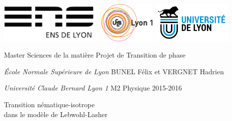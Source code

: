 \documentclass[11pt,a4paper]{article}
\author{Bunel Félix et Vergnet Hadrien}
\numberwithin{equation}{section}
\begin{document}
\begin{titlepage}
\thispagestyle{empty}
\setlength{\parindent}{0pt}

\includegraphics[height=1.9cm]{logo-ens.jpg} \hfill \includegraphics[height=2cm]{logo_lyon1.jpg} \hfill \includegraphics[height=2cm]{logo_univ_lyon.jpg}



Master Sciences de la matière
\hfill
Projet de Transition de phase 

\textit{École Normale Supérieure de Lyon}
\hfill
BUNEL Félix et VERGNET Hadrien

\textit{Université Claude Bernard Lyon 1}
\hfill
M2 Physique 2015-2016
\vspace{0.5cm}

\hrulefill
\vspace{-0.6cm}

\hrulefill


\begin{center}\bfseries
\vspace{0.3cm}
\begin{huge}
    Transition nématique-isotrope \\ dans le modèle de Lebwohl-Lasher
\end{huge}
\end{center}

\hrulefill
\vspace{-0.6cm}

\hrulefill



\end{titlepage}
\end{document}
